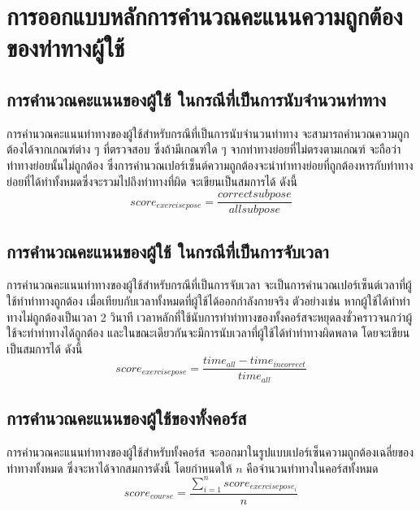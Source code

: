 \section{การออกแบบหลักการคำนวณคะแนนความถูกต้องของท่าทางผู้ใช้}
\subsection{การคำนวณคะแนนของผู้ใช้ ในกรณีที่เป็นการนับจำนวนท่าทาง}
การคำนวณคะแนนท่าทางของผู้ใช้สำหรับกรณีที่เป็นการนับจำนวนท่าทาง จะสามารถคำนวณความถูกต้องได้จากเกณฑ์ต่าง ๆ ที่ตรวจสอบ ซึ่งถ้ามีเกณฑ์ใด ๆ จากท่าทางย่อยที่ไม่ตรงตามเกณฑ์ จะถือว่าท่าทางย่อยนั้นไม่ถูกต้อง ซึ่งการคำนวณเปอร์เซ็นต์ความถูกต้องจะนำท่าทางย่อยที่ถูกต้องหารกับท่าทางย่อยที่ได้ทำทั้งหมดซึ่งจะรวมไปถึงท่าทางที่ผิด จะเขียนเป็นสมการได้ ดังนี้
\begin{equation}
    score_{exercise pose} = \frac{correct subpose}{all subpose}
\end{equation}

\subsection{การคำนวณคะแนนของผู้ใช้ ในกรณีที่เป็นการจับเวลา}
การคำนวณคะแนนท่าทางของผู้ใช้สำหรับกรณีที่เป็นการจับเวลา จะเป็นการคำนวณเปอร์เซ็นต์เวลาที่ผู้ใช้ทำท่าทางถูกต้อง เมื่อเทียบกับเวลาทั้งหมดที่ผู้ใช้ได้ออกกำลังกายจริง ตัวอย่างเช่น หากผู้ใช้ได้ทำท่าทางไม่ถูกต้องเป็นเวลา 2 วินาที เวลาหลักที่ใช้นับการทำท่าทางของทั้งคอร์สจะหยุดลงชั่วคราวจนกว่าผู้ใช้จะทำท่าทางได้ถูกต้อง และในขณะเดียวกันจะมีการนับเวลาที่ผู้ใช้ได้ทำท่าทางผิดพลาด โดยจะเขียนเป็นสมการได้ ดังนี้
\begin{equation}
     score_{exercise pose} = \frac{time_{all} - time_{incorrect}}{time_{all}}
\end{equation}


\subsection{การคำนวณคะแนนของผู้ใช้ของทั้งคอร์ส}
การคำนวณคะแนนท่าทางของผู้ใช้สำหรับทั้งคอร์ส จะออกมาในรูปแบบเปอร์เซ็นความถูกต้องเฉลี่ยของท่าทางทั้งหมด ซึ่งจะหาได้จากสมการดังนี้ โดยกำหนดให้ $n$ คือจำนวนท่าทางในคอร์สทั้งหมด
\begin{equation}
    score_{course} = \frac{\sum_{i=1}^{n}{score_{exercise pose_i}}}{n}
\end{equation}

